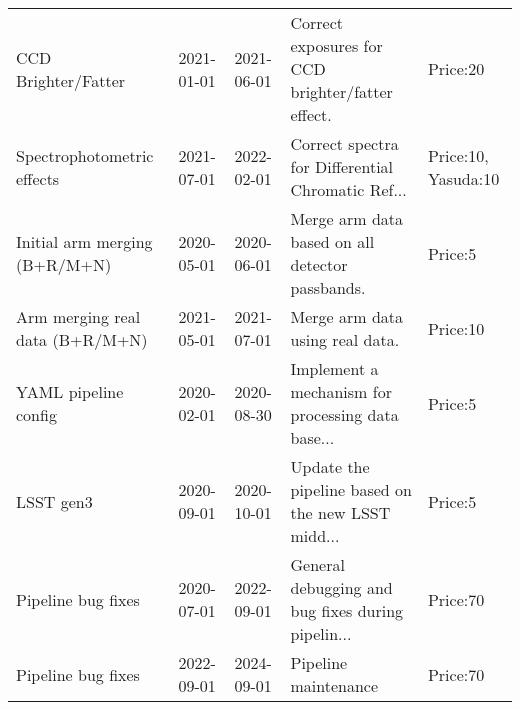 \begin{longtable}{p{2cm}llp{2cm}l}
                         CCD Brighter/Fatter &  2021-01-01 &  2021-06-01 &  Correct exposures for CCD brighter/fatter effect. &                      Price:20 \\
                  Spectrophotometric effects &  2021-07-01 &  2022-02-01 &  Correct spectra for Differential Chromatic Ref... &           Price:10, Yasuda:10 \\
               Initial arm merging (B+R/M+N) &  2020-05-01 &  2020-06-01 &    Merge arm data based on all detector passbands. &                       Price:5 \\
             Arm merging real data (B+R/M+N) &  2021-05-01 &  2021-07-01 &                    Merge arm data using real data. &                      Price:10 \\
                        YAML pipeline config &  2020-02-01 &  2020-08-30 &  Implement a mechanism for processing data base... &                       Price:5 \\
                                   LSST gen3 &  2020-09-01 &  2020-10-01 &  Update the pipeline based on the new LSST midd... &                       Price:5 \\
                          Pipeline bug fixes &  2020-07-01 &  2022-09-01 &  General debugging and bug fixes during pipelin... &                      Price:70 \\
                          Pipeline bug fixes &  2022-09-01 &  2024-09-01 &                               Pipeline maintenance &                      Price:70 \\
\end{longtable}
